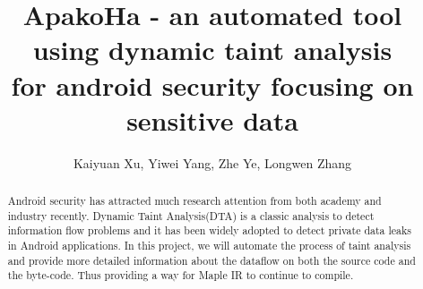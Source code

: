 \documentclass[
    ngerman,american
    ]{scrartcl}
\title{
        ApakoHa - an automated tool 
        \\ using dynamic taint analysis
        \\ for android security focusing on sensitive data
        \\  \Large{\paperSubTitle{\lang}}} %
\author{
        Kaiyuan Xu, Yiwei Yang, Zhe Ye, Longwen Zhang
        }
\newcommand{\lang}{en}
\begin{document}
      \maketitle
        \begin{abstract}

            \ifthenelse{\equal{en}{\lang}}{}{}
            Android security has attracted much research attention from both academy 
            and industry recently. Dynamic Taint Analysis(DTA) is a classic analysis to detect
             information flow problems and it has been widely adopted to detect private
             data leaks in Android applications. In this project, we will automate the
             process of taint analysis and provide more detailed information about the dataflow on both the source code 
             and the byte-code. Thus providing a way for Maple IR to continue to compile.

        \end{abstract}
        
        
        \sectionQuestions{\lang}
        \sectionQuestionsDescription{\lang}
        
\end{document}
